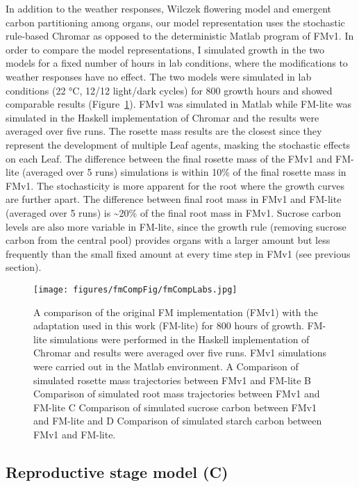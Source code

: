 In addition to the weather responses, Wilczek flowering model and emergent
carbon partitioning among organs, our model representation uses the stochastic
rule-based Chromar as opposed to the deterministic Matlab program of FMv1. In
order to compare the model representations, I simulated growth in the two
models for a fixed number of hours in lab conditions, where the modifications to
weather responses have no effect.  The two models were simulated in lab
conditions (22 °C, 12/12 light/dark cycles) for \(800\) growth hours and showed
comparable results (Figure~\ref{fig:comp}). FMv1 was simulated in Matlab while
FM-lite was simulated in the Haskell implementation of Chromar and the results
were averaged over five runs. The rosette mass results are the closest since
they represent the development of multiple Leaf agents, masking the stochastic
effects on each Leaf. The difference between the final rosette mass of the FMv1
and FM-lite (averaged over 5 runs) simulations is within 10\% of the final
rosette mass in FMv1. The stochasticity is more apparent for the root where the
growth curves are further apart. The difference between final root mass in FMv1
and FM-lite (averaged over 5 runs) is \textasciitilde{}20\% of the final root
mass in FMv1. Sucrose carbon levels are also more variable in FM-lite, since the
growth rule (removing sucrose carbon from the central pool) provides organs with
a larger amount but less frequently than the small fixed amount at every time
step in FMv1 (see previous section).

\begin{figure}[tb]
  \centering
  \texttt{[image: figures/fmCompFig/fmCompLabs.jpg]}
  \caption{A comparison of the original FM implementation (FMv1) with the
    adaptation used in this work (FM-lite) for 800 hours of growth. FM-lite
    simulations were performed in the Haskell implementation of Chromar and
    results were averaged over five runs. FMv1 simulations were carried out in
    the Matlab environment. A Comparison of simulated rosette mass trajectories
    between FMv1 and FM-lite B Comparison of simulated root mass trajectories
    between FMv1 and FM-lite C Comparison of simulated sucrose carbon between
    FMv1 and FM-lite and D Comparison of simulated starch carbon between FMv1
    and FM-lite.}
  \label{fig:comp}
\end{figure}
%

\subsection{Reproductive stage model (C)}
\label{reproductive-stage-model-c}

